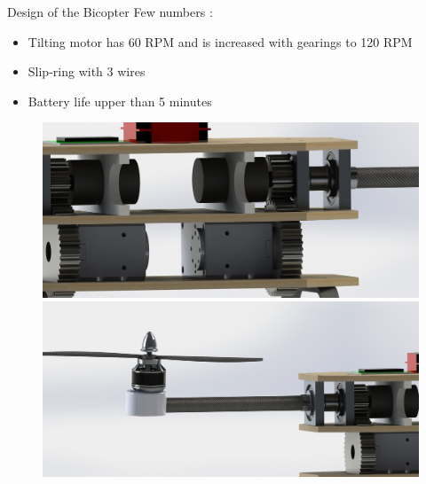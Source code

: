 \documentclass{beamer}
\begin{document}
\begin{frame}{Design of the Bicopter}
Few numbers :
\begin{itemize}
\item Tilting motor has 60 RPM and is increased with gearings to 120 RPM
\item Slip-ring with 3 wires
\item Battery life upper than 5 minutes
\end{itemize}
\begin{figure}
\includegraphics[scale=0.04]{pictures/zoom1}
\includegraphics[scale=0.04]{pictures/zoom2}
\end{figure}
\end{frame}
\end{document}
